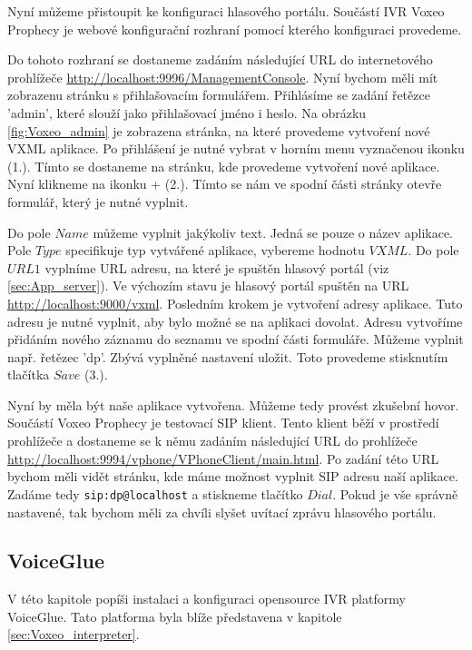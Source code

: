 \documentclass[ing,male,java,dept460]{diploma}						%
\begin{document}

Nyní můžeme přistoupit ke konfiguraci hlasového portálu. Součástí IVR Voxeo Prophecy je webové konfigurační rozhraní pomocí kterého konfiguraci provedeme.

Do tohoto rozhraní se dostaneme zadáním následující URL do internetového prohlížeče \url{http://localhost:9996/ManagementConsole}. Nyní bychom měli mít zobrazenu stránku s přihlašovacím formulářem. Přihlásíme se zadání řetězce 'admin', které slouží jako přihlašovací jméno i heslo. Na obrázku \ref{fig:Voxeo_admin} je zobrazena stránka, na které provedeme vytvoření nové VXML aplikace. Po přihlášení je nutné vybrat v horním menu vyznačenou ikonku (1.). Tímto se dostaneme na stránku, kde provedeme vytvoření nové aplikace. Nyní klikneme na ikonku + (2.). Tímto se nám ve spodní části stránky otevře formulář, který je nutné vyplnit.

Do pole $Name$ můžeme vyplnit jakýkoliv text. Jedná se pouze o název aplikace. Pole $Type$ specifikuje typ vytvářené aplikace, vybereme hodnotu $VXML$. Do pole $URL1$ vyplníme URL adresu, na které je spuštěn hlasový portál (viz \ref{sec:App_server}). Ve výchozím stavu je hlasový portál spuštěn na URL \url{http://localhost:9000/vxml}. Posledním krokem je vytvoření adresy aplikace. Tuto adresu je nutné vyplnit, aby bylo možné se na aplikaci dovolat. Adresu vytvoříme přidáním nového záznamu do seznamu ve spodní části formuláře. Můžeme vyplnit např. řetězec 'dp'. Zbývá vyplněné nastavení uložit. Toto provedeme stisknutím tlačítka $Save$ (3.).

Nyní by měla být naše aplikace vytvořena. Můžeme tedy provést zkušební hovor. Součástí Voxeo Prophecy je testovací SIP klient. Tento klient běží v prostředí prohlížeče a dostaneme se k němu zadáním následující URL do prohlížeče \url{http://localhost:9994/vphone/VPhoneClient/main.html}. Po zadání této URL bychom měli vidět stránku, kde máme možnost vyplnit SIP adresu naší aplikace. Zadáme tedy \texttt{sip:dp@localhost} a stiskneme tlačítko $Dial$. Pokud je vše správně nastavené, tak bychom měli za chvíli slyšet uvítací zprávu hlasového portálu.

\subsection{VoiceGlue}
\label{sec:voiceglue_conf}
V této kapitole popíši instalaci a konfiguraci opensource IVR platformy VoiceGlue. Tato platforma byla blíže představena v kapitole \ref{sec:Voxeo_interpreter}.
\end{document}
